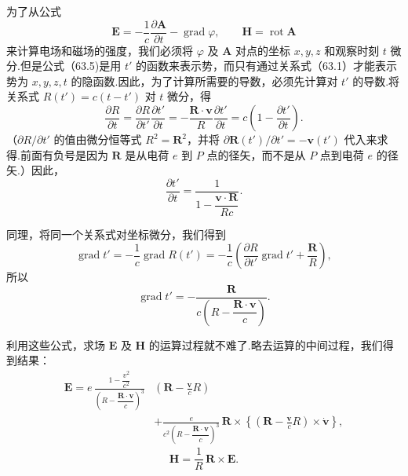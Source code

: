 为了从公式
\begin{equation*}
  \boldsymbol{E}=-\frac{1}{c}\frac{\partial\boldsymbol{A}}{\partial t}
  -\operatorname{grad}\varphi,\qquad
  \boldsymbol{H}=\operatorname{rot}\boldsymbol{A}
\end{equation*}
来计算电场和磁场的强度，我们必须将 $\varphi$ 及 $\boldsymbol{A}$ 对点的坐标 $x,y,z$ 和观察时刻 $t$ 微分.但是公式（63.5)是用 $t'$ 的函数来表示势，而只有通过关系式（63.1）才能表示势为 $x,y,z,t$ 的隐函数.因此，为了计算所需要的导数，必须先计算对 $t'$ 的导数.将关系式 $R(t')=c(t-t')$ 对 $t$ 微分，得
\begin{equation*}
  \frac{\partial R}{\partial t}
  =\frac{\partial R}{\partial t'}\frac{\partial t'}{\partial t}
  =-\frac{\boldsymbol{R}\cdot\boldsymbol{v}}{R}\frac{\partial t'}{\partial t}
  =c\left(1-\frac{\partial t'}{\partial t}\right).
\end{equation*}
（$\partial R/\partial t'$ 的值由微分恒等式 $R^2=\boldsymbol{R}^2$，并将
$\partial\boldsymbol{R}(t')/\partial t'=-\boldsymbol{v}(t')$ 代入来求得.前面有负号是因为 $\boldsymbol{R}$ 是从电荷 $e$ 到 $P$ 点的径矢，而不是从 $P$ 点到电荷 $e$ 的径矢.）因此，
\begin{equation}
  \frac{\partial t'}{\partial t}
  =\frac{1}{1-\dfrac{\boldsymbol{v}\cdot\boldsymbol{R}}{Rc}}.
\end{equation}

同理，将同一个关系式对坐标微分，我们得到
\begin{equation*}
  \operatorname{grad}t'=-\frac{1}{c}\operatorname{grad}R(t')
  =-\frac{1}{c}\left(\frac{\partial R}{\partial t'}\operatorname{grad}t'
  +\frac{\boldsymbol{R}}{R}\right),
\end{equation*}
所以
\begin{equation}
  \operatorname{grad}t'
  =-\frac{\boldsymbol{R}}{c\left(R-\dfrac{\boldsymbol{R}\cdot\boldsymbol{v}}{c}\right)}.
\end{equation}

利用这些公式，求场 $\boldsymbol{E}$ 及 $\boldsymbol{H}$ 的运算过程就不难了.略去运算的中间过程，我们得到结果：
\begin{equation}
\begin{aligned}
  \boldsymbol{E}=e\,\frac{1-\dfrac{v^2}{c^2}}
  {\left(R-\dfrac{\boldsymbol{R}\cdot\boldsymbol{v}}{c}\right)^{3}}
  &\left(\boldsymbol{R}-\frac{\boldsymbol{v}}{c}R\right)\\
  &+\frac{e}{c^2\left(R-\dfrac{\boldsymbol{R}\cdot\boldsymbol{v}}{c}\right)^{3}}
  \,\boldsymbol{R}\times\left\{\left(\boldsymbol{R}
  -\frac{\boldsymbol{v}}{c}R\right)\times\dot{\boldsymbol{v}}\right\},
\end{aligned}
\end{equation}
\begin{equation}
  \boldsymbol{H}=\frac{1}{R}\,\boldsymbol{R}\times\boldsymbol{E}.
\end{equation}


